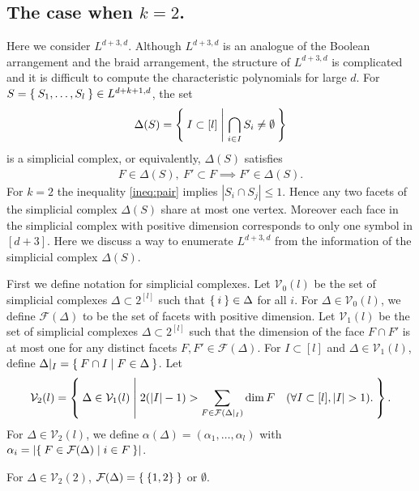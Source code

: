 \documentclass{wstmp}
\begin{document}
\subsection{The case when $k=2$.}
Here we consider $L^{d+3,d}$.
Although $L^{d+3,d}$ is an analogue of 
the Boolean arrangement and the braid arrangement, 
the structure of $L^{d+3,d}$
is complicated and it is difficult to compute  the characteristic polynomials
for large $d$.
For $S=\Set{S_1,\ldots,S_l} \in L^{d+k+1,d}$,
the set
\begin{align*}
\Delta(S)=\Set{ I \subset [l] | \bigcap_{i \in I} S_i \neq \emptyset}
\end{align*}
is a simplicial complex,
or equivalently, $\Delta(S)$ satisfies
\begin{align*}
F\in\Delta(S),\ F' \subset F \implies F'\in\Delta(S).
\end{align*}
For  $k=2$
the inequality \eqref{ineq:pair} 
implies ${\left|{S_i \cap S_j}\right|} \leq 1$.
Hence any two facets  of the simplicial complex $\Delta(S)$
share at most one vertex.
Moreover each face in the simplicial complex with positive dimension
corresponds to only one symbol in $[d+3]$.
Here we discuss a way to enumerate $L^{d+3,d}$ 
from the information of the
simplicial complex $\Delta(S)$.

First we define notation for simplicial complexes.
Let ${\mathcal{V}}_0(l)$ be the set of simplicial complexes $\Delta\subset 2^{[l]}$ 
such that $\Set{i} \in \Delta$ for all $i$.
For $\Delta \in {\mathcal{V}}_0(l)$,
we define ${\mathcal{F}}(\Delta)$ to be the set 
of facets with positive dimension.
Let ${\mathcal{V}}_1(l)$ be the set of  simplicial complexes $\Delta\subset 2^{[l]}$ 
 such that 
the dimension of the face $F\cap F'$ is at most one
for any distinct facets $F,F' \in {\mathcal{F}}(\Delta)$.
For $I\subset [l]$ and $\Delta \in {\mathcal{V}}_1(l)$,
define $\Delta|_{I} = \Set{ F\cap I| F \in \Delta}$.
Let 
\begin{align*}
{\mathcal{V}}_2(l)=\Set{
\Delta \in {\mathcal{V}}_1(l)
|
2({\left|{I}\right|}-1)>\sum_{F\in {\mathcal{F}}(\Delta|_{I})} \dim F
\quad(\forall I\subset [l], {\left|{I}\right|}>1).
}.
\end{align*}
For $\Delta \in {\mathcal{V}}_2(l)$,
we define $\alpha(\Delta)=(\alpha_1,\ldots,\alpha_l)$
with $\alpha_i = {\left|{\Set{F \in {\mathcal{F}}(\Delta)| i \in F}}\right|}$.
\begin{example}
For $\Delta \in {\mathcal{V}}_2(2)$,
${\mathcal{F}}(\Delta)=\Set{\{1,2\}}$ or $\emptyset$.
\end{example}
\end{document}
